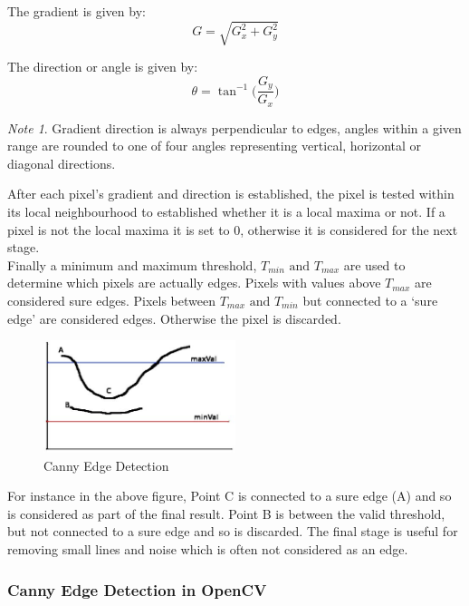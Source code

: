 \documentclass{article}
\theoremstyle{definition}
\theoremstyle{remark}
\newtheorem*{nb}{Note}
\begin{document}
\noindent The gradient is given by: 
\begin{equation*}
    G = \sqrt{G_x^2 + G_y^2}
\end{equation*}

\noindent The direction or angle is given by:
\begin{equation}
    \theta = \tan^{-1}\bigg(\frac{G_y}{G_x}\bigg)
\end{equation}

\begin{nb}
Gradient direction is always perpendicular to edges, angles within a given range are rounded to one of four angles representing vertical, horizontal or diagonal directions.
\end{nb}

After each pixel's gradient and direction is established, the pixel is tested within its local neighbourhood to established whether it is a local maxima or not. If a pixel is not the local maxima it is set to 0, otherwise it is considered for the next stage. \\

Finally a minimum and maximum threshold, $ T_{min} \text{ and } T_{max} $ are used to determine which pixels are actually edges. Pixels with values above $ T_{max} $ are considered sure edges. Pixels between $ T_{max} \text{ and } T_{min} $ but connected to a `sure edge' are considered edges. Otherwise the pixel is discarded.

\begin{figure}[H]
    \centering
    \includegraphics[width=0.5\textwidth]{canny}
    \caption{Canny Edge Detection}
    \label{fig:canny}
\end{figure}

For instance in the above figure, Point C is connected to a sure edge (A) and so is considered as part of the final result. Point B is between the valid threshold, but not connected to a sure edge and so is discarded. The final stage is useful for removing small lines and noise which is often not considered as an edge.


\subsubsection{Canny Edge Detection in OpenCV}
\end{document}
